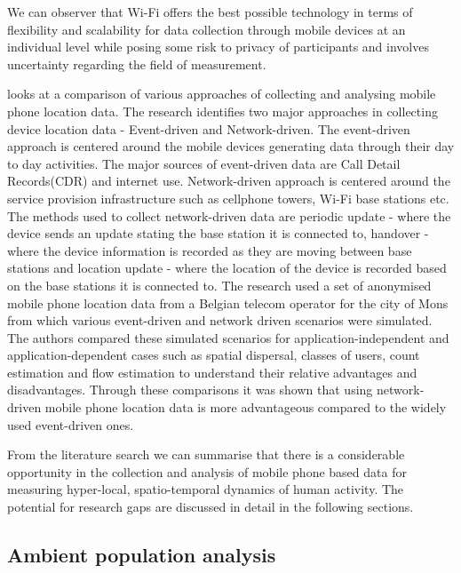 We can observer that Wi-Fi offers the best possible technology in terms of flexibility and scalability for data collection through mobile devices at an individual level while posing some risk to privacy of participants and involves uncertainty regarding the field of measurement.

\citep{pinelli2015} looks at a comparison of various approaches of collecting and analysing mobile phone location data.
The research identifies two major approaches in collecting device location data - Event-driven and Network-driven.
The event-driven approach is centered around the mobile devices generating data 
through their day to day activities.
The major sources of event-driven data are Call Detail Records(CDR) and internet use.
Network-driven approach is centered around the service provision infrastructure such as cellphone towers, Wi-Fi base stations etc.
The methods used to collect network-driven data are periodic update - where the device sends an update stating the base station it is connected to, handover - where the device information is recorded as they are moving between base stations and location update - where the location of the device is recorded based on the base stations it is connected to. 
The research used a set of anonymised mobile phone location data from a Belgian telecom operator for the city of Mons from which various event-driven and network driven scenarios were simulated. 
The authors compared these simulated scenarios for application-independent and application-dependent cases such as spatial dispersal, classes of users, count estimation and flow estimation to understand their relative advantages and disadvantages.
Through these comparisons it was shown that using network-driven mobile phone location data is more advantageous compared to the widely used event-driven ones.

From the literature search we can summarise that there is a considerable opportunity in the collection and analysis of mobile phone based data for measuring hyper-local, spatio-temporal dynamics of human activity.
The potential for research gaps are discussed in detail in the following sections.

\subsection{Ambient population analysis}

